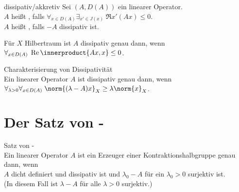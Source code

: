 \linie

\begin{Def}{dissipativ/akkretiv}
    Sei $(A, D(A))$ ein linearer Operator.\\
    $A$ heißt , falls
    $\forall_{x \in D(A)} \exists_{x' \in J(x)}\; \Re x'(Ax) \le 0$.\\
    $A$ heißt , falls $-A$ dissipativ ist.
\end{Def}

\begin{Bem}
    Für $X$ Hilbertraum ist $A$ dissipativ genau dann, wenn
    $\forall_{x \in D(A)}\; \Re \innerproduct{Ax, x} \le 0$.
\end{Bem}


\linie

\begin{Satz}{Charakterisierung von Dissipativität}\\
    Ein linearer Operator $A$ ist dissipativ genau dann, wenn
    $\forall_{\lambda > 0} \forall_{x \in D(A)}\; \norm{(\lambda - A) x}_X \ge \lambda \norm{x}_X$.
\end{Satz}

\pagebreak

\section{%
    Der Satz von -%
}

\begin{Satz}{Satz von -}\\
    Ein linearer Operator $A$ ist ein Erzeuger einer Kontraktionshalbgruppe genau dann, wenn\\
    $A$ dicht definiert und dissipativ ist und
    $\lambda_0 - A$ für ein $\lambda_0 > 0$ surjektiv ist.\\
    (In diesem Fall ist $\lambda - A$ für alle $\lambda > 0$ surjektiv.)
\end{Satz}

\linie

